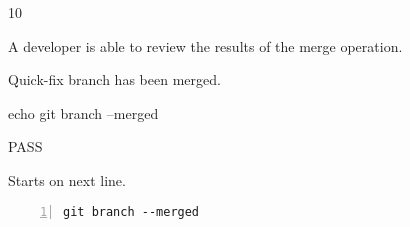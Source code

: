 \begin{description}[align=right,leftmargin=3.2cm,labelindent=3.0cm]
\item[Step:] 10
\item[Confirm:] A developer is able to review the results of the merge operation.
\item[Expectation:] Quick-fix branch has been merged.
\item[Command:] echo git  branch --merged
\item[Test Result:] PASS
\item[Evidence:] Starts on next line.
\end{description}
\begin{lstlisting}[numbers=left]
git branch --merged

\end{lstlisting}
